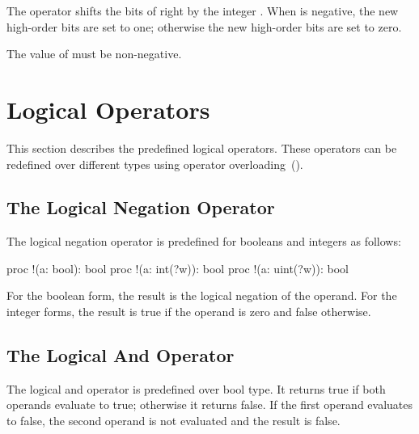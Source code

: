 The \chpl{>>} operator shifts the bits of  right by the
integer .  When  is negative, the new high-order bits
are set to one; otherwise the new high-order bits are set to zero.

The value of  must be non-negative.

\section{Logical Operators}
\label{Logical_Operators}

This section describes the predefined logical operators.  These
operators can be redefined over different types using operator
overloading~().

\subsection{The Logical Negation Operator}
\label{Logical_Negation_Operators}

The logical negation operator is predefined for booleans and integers
as follows:

\begin{chapel}
proc !(a: bool): bool
proc !(a: int(?w)): bool
proc !(a: uint(?w)): bool
\end{chapel}
For the boolean form, the result is the logical negation of the
operand.  For the integer forms, the result is true if the operand is
zero and false otherwise.

\subsection{The Logical And Operator}
\label{Logical_And_Operators}

The logical and operator is predefined over bool type.  It returns
true if both operands evaluate to true; otherwise it returns false.
If the first operand evaluates to false, the second operand is not
evaluated and the result is false.

